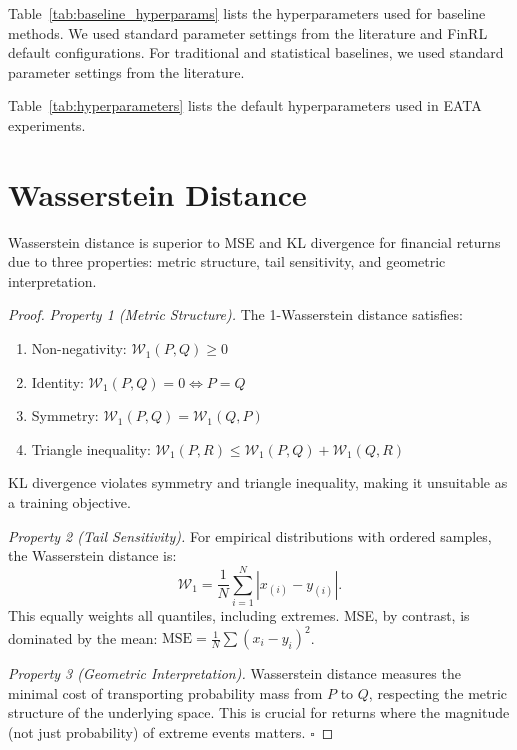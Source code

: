 Table~\ref{tab:baseline_hyperparams} lists the hyperparameters used for baseline methods. We used standard parameter settings from the literature and FinRL default configurations. For traditional and statistical baselines, we used standard parameter settings from the literature.

\begin{table}[htbp]
\centering
\caption{EATA Hyperparameters}
\label{tab:hyperparameters}

\end{table}

Table~\ref{tab:hyperparameters} lists the default hyperparameters used in EATA experiments.


\section{Wasserstein Distance}
\label{app:wasserstein}

\begin{proposition}
    Wasserstein distance is superior to MSE and KL divergence for financial returns due to three properties: metric structure, tail sensitivity, and geometric interpretation.
\end{proposition}

\begin{proof}

\textit{Property 1 (Metric Structure).} The 1-Wasserstein distance satisfies:
\begin{enumerate}
    \item Non-negativity: $\mathcal{W}_1(P, Q) \geq 0$
    \item Identity: $\mathcal{W}_1(P, Q) = 0 \iff P = Q$
    \item Symmetry: $\mathcal{W}_1(P, Q) = \mathcal{W}_1(Q, P)$
    \item Triangle inequality: $\mathcal{W}_1(P, R) \leq \mathcal{W}_1(P, Q) + \mathcal{W}_1(Q, R)$
\end{enumerate}
KL divergence violates symmetry and triangle inequality, making it unsuitable as a training objective.

\textit{Property 2 (Tail Sensitivity).} For empirical distributions with ordered samples, the Wasserstein distance is:
\begin{equation}
\mathcal{W}_1 = \frac{1}{N} \sum_{i=1}^{N} |x_{(i)} - y_{(i)}|.
\end{equation}
This equally weights all quantiles, including extremes. MSE, by contrast, is dominated by the mean: $\text{MSE} = \frac{1}{N}\sum (x_i - y_i)^2$.

\textit{Property 3 (Geometric Interpretation).} Wasserstein distance measures the minimal cost of transporting probability mass from $P$ to $Q$, respecting the metric structure of the underlying space. This is crucial for returns where the magnitude (not just probability) of extreme events matters. $\square$

\end{proof}

